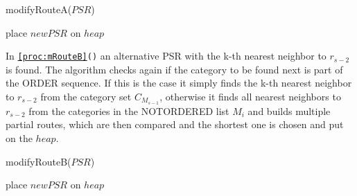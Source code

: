 \begin{procedure}[H]
\caption{modifyRouteA($PSR$)}
\label{proc:mRouteA}


	place $newPSR$ on $heap$\;
\end{procedure}

\vspace{\baselineskip}

In \texttt{\ref{proc:mRouteB}()} an alternative PSR with the k-th nearest neighbor to $r_{s-2}$ is found. The algorithm checks again if the category to be found next is part of the ORDER sequence. If this is the case it simply finds the k-th nearest neighbor to $r_{s-2}$ from the category set $C_{M_{s-1}}$, otherwise it finds all nearest neighbors to $r_{s-2}$ from the categories in the NOTORDERED list $M_{i}$ and builds multiple partial routes, which are then compared and the shortest one is chosen and put on the $heap$. \newline

\begin{procedure}[H]
\caption{modifyRouteB($PSR$)}
\label{proc:mRouteB}
	
	

	place $newPSR$ on $heap$\;
\end{procedure}

